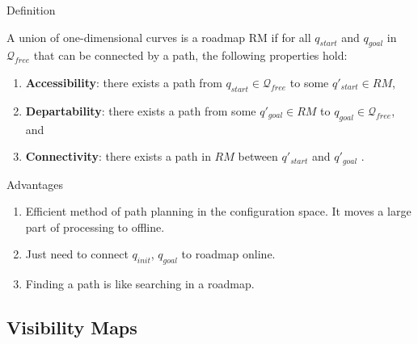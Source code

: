 \documentclass[handout]{beamer}
\begin{document}
  \begin{frame}{Definition}
    
    A union of one-dimensional curves is a roadmap RM if for all $q_{start}$ and $q_{goal}$ in $\mathcal{Q}_{free}$ that can be connected by a path, the following properties hold:
    \begin{enumerate}
      \item \textbf{Accessibility}: there exists a path from $q_{start} \in \mathcal{Q}_{free}$ to some $q'_{start}  \in RM$,
      \item \textbf{Departability}: there exists a path from some $q'_{goal} \in RM$ to $q_{goal} \in \mathcal{Q}_{free}$, and
      \item \textbf{Connectivity}: there exists a path in $RM$ between $q'_{start}$  and $q'_{goal}$   .
    \end{enumerate}

  \end{frame}

  \begin{frame}{Advantages}
    
    \begin{enumerate}
      \item Efficient method of path planning in the configuration space. It moves a large part of processing to offline. 
      \item Just need to connect $q_{init}$, $q_{goal}$ to roadmap online.
      \item Finding a path is like searching in a roadmap.
    \end{enumerate}

  \end{frame}

  \subsection[Visibility Maps]{Visibility Maps}
\end{document}
